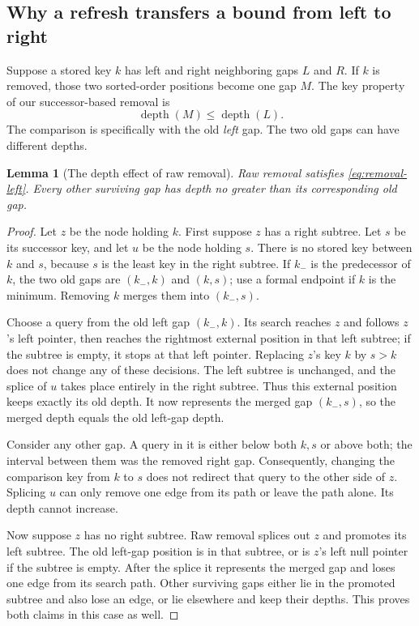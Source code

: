 \documentclass[11pt,a4paper]{article}
\theoremstyle{readable}
\newtheorem{lemma}[theorem]{Lemma}
\begin{document}
\subsection{Why a refresh transfers a bound from left to right}
\label{sec:transfer}

Suppose a stored key $k$ has left and right neighboring gaps $L$ and
$R$. If $k$ is removed, those two sorted-order positions become one
gap $M$. The key property of our successor-based removal is
\begin{equation}
  \operatorname{depth}(M)\le\operatorname{depth}(L).
  \label{eq:removal-left}
\end{equation}
The comparison is specifically with the old \emph{left} gap. The two
old gaps can have different depths.

\begin{lemma}[The depth effect of raw removal]
\label{lem:removal}
Raw removal satisfies \eqref{eq:removal-left}. Every other surviving
gap has depth no greater than its corresponding old gap.
\end{lemma}

\begin{proof}
Let $z$ be the node holding $k$. First suppose $z$ has a right subtree.
Let $s$ be its successor key, and let $u$ be the node holding $s$.
There is no stored key between $k$ and $s$, because $s$ is the least
key in the right subtree. If $k_-$ is the predecessor of $k$, the
two old gaps are $(k_-,k)$ and $(k,s)$; use a formal endpoint if $k$
is the minimum. Removing $k$ merges them into $(k_-,s)$.

Choose a query from the old left gap $(k_-,k)$. Its search reaches $z$
and follows $z$'s left pointer, then reaches the rightmost external
position in that left subtree; if the subtree is empty, it stops at
that left pointer. Replacing $z$'s key $k$ by $s>k$ does not change
any of these decisions. The left subtree is unchanged, and the splice
of $u$ takes place entirely in the right subtree. Thus this external
position keeps exactly its old depth. It now represents the merged
gap $(k_-,s)$, so the merged depth equals the old left-gap depth.

Consider any other gap. A query in it is either below both $k,s$ or
above both; the interval between them was the removed right gap.
Consequently, changing the comparison key from $k$ to $s$ does not
redirect that query to the other side of $z$. Splicing $u$ can only
remove one edge from its path or leave the path alone. Its depth
cannot increase.

Now suppose $z$ has no right subtree. Raw removal splices out $z$
and promotes its left subtree. The old left-gap position is in that
subtree, or is $z$'s left null pointer if the subtree is empty.
After the splice it represents the merged gap and loses one edge
from its search path. Other surviving gaps either lie in the promoted
subtree and also lose an edge, or lie elsewhere and keep their depths.
This proves both claims in this case as well.
\end{proof}
\end{document}
